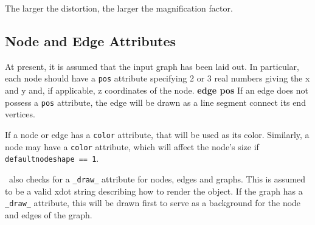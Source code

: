 The larger the distortion, the larger the magnification factor.

\subsection{Node and Edge Attributes}
At present, it is assumed that the input graph has been laid out. In particular,
each node should have a {\tt pos} attribute specifying 2 or 3 real numbers giving the
x and y and, if applicable, z coordinates of the node. {\bf edge pos}
If an edge does not possess a {\tt pos} attribute, the edge will be drawn as a line segment
connect its end vertices.

If a node or edge has a {\tt color} attribute, that will be used as its color.
Similarly, a node may have a {\tt color} attribute, which will affect the node's size if
{\tt defaultnodeshape == 1}.

\smyrna\ also checks for a {\tt \_draw\_} attribute
for nodes, edges and graphs. This is assumed to be a valid xdot string describing how to 
render the object. If the graph has a {\tt \_draw\_} attribute, this will be drawn first to serve
as a background for the node and edges of the graph.


